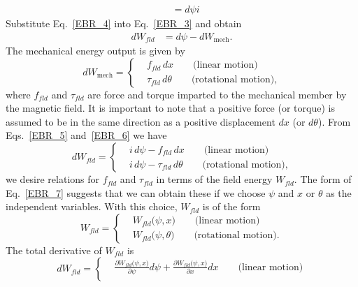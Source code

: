 \documentclass[12pt,a4paper,oneside]{book}
\begin{document}
\begin{onehalfspace}
\begin{equation}
\begin{aligned}
			&=d\psi i
	\end{aligned}
\end{equation} 
Substitute Eq.~\eqref{EBR_4} into Eq.~\eqref{EBR_3} and obtain
\begin{equation}\label{EBR_5}
	\begin{aligned}
		dW_{fld}  &= d\psi - dW_{\text{mech}}.
	\end{aligned}
\end{equation} 
The mechanical energy output is given by
\begin{equation}\label{EBR_6}
	dW_{\text{mech}}  = \left\{
	\begin{aligned}
		&f_{fld}\,dx \qquad \text{(linear motion)} \\[8pt]
		&\tau_{fld}\,d\theta \qquad \text{(rotational motion),} 
	\end{aligned}\right.
\end{equation} 
where $f_{fld}$ and $\tau_{fld}$ are force and torque imparted to the mechanical member by the magnetic field. It is important to note that a positive force (or torque) is assumed to be in the same direction as a positive displacement $dx$ (or $d\theta$). From Eqs.~\eqref{EBR_5} and~\ref{EBR_6} we have
\begin{equation}\label{EBR_7}
	dW_{fld}  = \left\{
	\begin{aligned}
		&i\,d\psi - f_{fld}\,dx \qquad \text{(linear motion)} \\[8pt]
		&i\,d\psi - \tau_{fld}\,d\theta \qquad \text{(rotational motion),} 
	\end{aligned}\right.
\end{equation} 
we desire relations for $f_{fld}$ and $\tau_{fld}$ in terms of the field energy $W_{fld}$. The form of Eq.~\eqref{EBR_7} suggests that we can obtain these if we choose $\psi$ and $x$ or $\theta$ as the independent variables. With this choice, $W_{fld}$ is of the form
\begin{equation}\label{EBR_8}
	W_{fld}  = \left\{
	\begin{aligned}
		&W_{fld}\big(\psi,x\big) \qquad \text{(linear motion)} \\[8pt]
		&W_{fld}\big(\psi,\theta\big) \qquad \text{(rotational motion).} 
	\end{aligned}\right.
\end{equation} 
The total derivative of $W_{fld}$ is
\begin{equation}\label{EBR_9}
	dW_{fld}  = \left\{
	\begin{aligned}
		&\frac{\partial W_{fld}\big(\psi,x\big)}{\partial\psi}d\psi +  \frac{\partial W_{fld}\big(\psi,x\big)}{\partial x}dx \qquad \text{(linear motion)} \\[8pt]

\end{aligned}
\end{equation}
\end{onehalfspace}
\end{document}
